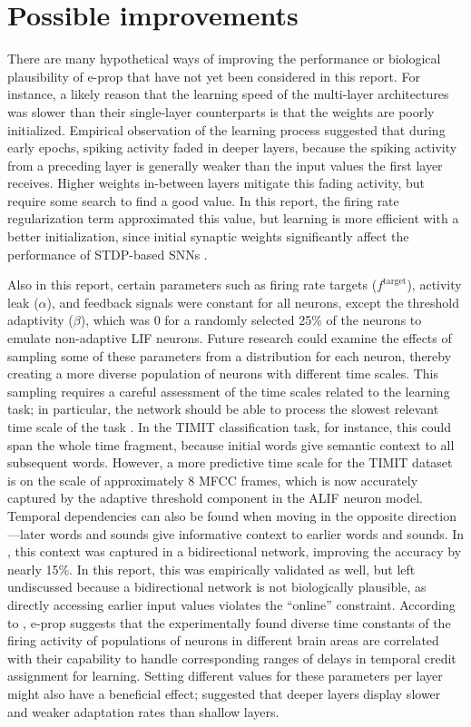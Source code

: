 \section{Possible improvements}
    There are many hypothetical ways of improving the performance or biological plausibility of e-prop that have not yet been considered in this report.
    For instance, a likely reason that the learning speed of the multi-layer architectures was slower than their single-layer counterparts is that the weights are poorly initialized.
    Empirical observation of the learning process suggested that during early epochs, spiking activity faded in deeper layers, because the spiking activity from a preceding layer is generally weaker than the input values the first layer receives.
    Higher weights in-between layers mitigate this fading activity, but require some search to find a good value.
    In this report, the firing rate regularization term approximated this value, but learning is more efficient with a better initialization, since initial synaptic weights significantly affect the performance of STDP-based SNNs \citep{kim2020initial}.

    Also in this report, certain parameters such as firing rate targets ($f^\text{target}$), activity leak ($\alpha$), and feedback signals were constant for all neurons, except the threshold adaptivity ($\beta$), which was 0 for a randomly selected 25\% of the neurons to emulate non-adaptive LIF neurons.
    Future research could examine the effects of sampling some of these parameters from a distribution for each neuron, thereby creating a more diverse population of neurons with different time scales.
    This sampling requires a careful assessment of the time scales related to the learning task; in particular, the network should be able to process the slowest relevant time scale of the task \citep{jaeger2021dimensions}.
    In the TIMIT classification task, for instance, this could span the whole time fragment, because initial words give semantic context to all subsequent words.
    However, a more predictive time scale for the TIMIT dataset is on the scale of approximately 8 MFCC frames, which is now accurately captured by the adaptive threshold component in the ALIF neuron model.
    Temporal dependencies can also be found when moving in the opposite direction---later words and sounds give informative context to earlier words and sounds.
    In \citet{bellec2020solution}, this context was captured in a bidirectional network, improving the accuracy by nearly 15\%.
    In this report, this was empirically validated as well, but left undiscussed because a bidirectional network is not biologically plausible, as directly accessing earlier input values violates the ``online'' constraint.
    According to \citet{bellec2020solution}, e-prop suggests that the experimentally found diverse time constants of the firing activity of populations of neurons in different brain areas \citep{runyan2017distinct} are correlated with their capability to handle corresponding ranges of delays in temporal credit assignment for learning.
    Setting different values for these parameters per layer might also have a beneficial effect; \citet{ahmed1998estimates} suggested that deeper layers display slower and weaker adaptation rates than shallow layers.

